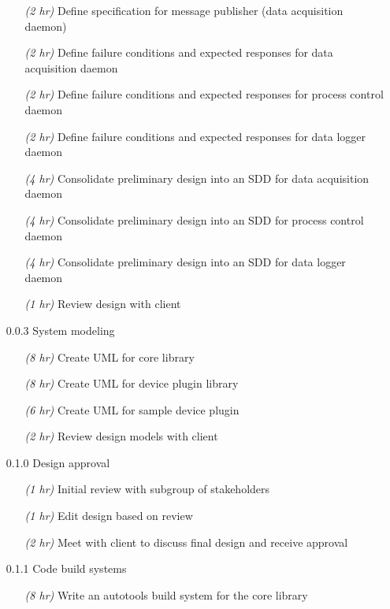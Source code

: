 \documentclass[11pt]{article}
\begin{document}
\begin{itemize}
\begin{itemize}
            \item[\emph{(2 hr)}] Define specification for message publisher (data acquisition daemon)
            \item[\emph{(2 hr)}] Define failure conditions and expected responses for data acquisition daemon
            \item[\emph{(2 hr)}] Define failure conditions and expected responses for process control daemon
            \item[\emph{(2 hr)}] Define failure conditions and expected responses for data logger daemon
            \item[\emph{(4 hr)}] Consolidate preliminary design into an SDD for data acquisition daemon
            \item[\emph{(4 hr)}] Consolidate preliminary design into an SDD for process control daemon
            \item[\emph{(4 hr)}] Consolidate preliminary design into an SDD for data logger daemon
            \item[\emph{(1 hr)}] Review design with client
          \end{itemize}
        \item[0.0.3] System modeling
          \begin{itemize}
            \item[\emph{(8 hr)}] Create UML for core library
            \item[\emph{(8 hr)}] Create UML for device plugin library
            \item[\emph{(6 hr)}] Create UML for sample device plugin
            \item[\emph{(2 hr)}] Review design models with client
          \end{itemize}
        \item[0.1.0] Design approval
          \begin{itemize}
            \item[\emph{(1 hr)}] Initial review with subgroup of stakeholders
            \item[\emph{(1 hr)}] Edit design based on review
            \item[\emph{(2 hr)}] Meet with client to discuss final design and receive approval
          \end{itemize}
        \item[0.1.1] Code build systems
          \begin{itemize}
            \item[\emph{(8 hr)}] Write an autotools build system for the core library

\end{itemize}
\end{itemize}
\end{document}
